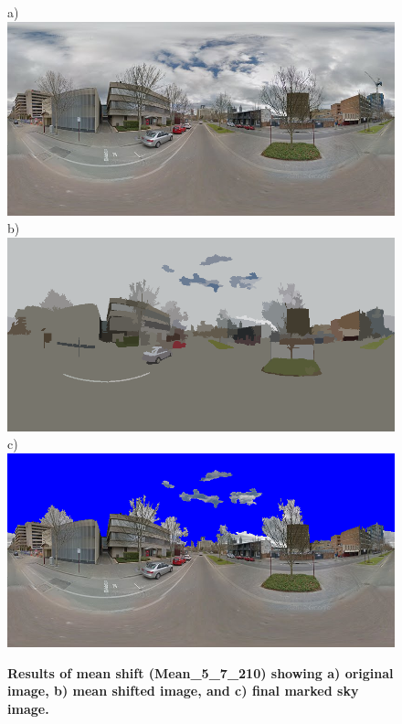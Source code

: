 \documentclass[final,3p,times,authoryear]{elsarticle}
\begin{document}
\begin{figure}
\centering    
a)\includegraphics[scale=0.25]{Images/panorama-ESuX4xmQ_fDc50NK6CnfZQ-1_cropped.png} 
b)\includegraphics[scale=0.25]{Images/panorama-ESuX4xmQ_fDc50NK6CnfZQ-1_seg.png} 
c)\includegraphics[scale=0.25]{Images/panorama-ESuX4xmQ_fDc50NK6CnfZQ-1_ms_sky_mark.png} 
\caption{\bf Results of mean shift (Mean\_5\_7\_210) showing a) original image, b) mean shifted image, and c) final marked sky image.}    
 \label{fig:meanresults}  
\end{figure} 
\end{document}
